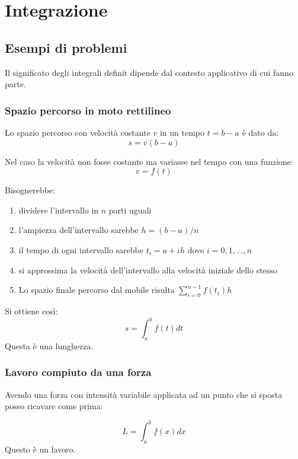 \chapter{Integrazione}

\section{Esempi di problemi}
Il significato degli integrali definit dipende dal contesto applicativo di cui fanno
parte.

\subsection{Spazio percorso in moto rettilineo}
Lo spazio percorso con velocità costante $v$ in un tempo $t = b - a$ è dato da:
\begin{equation*}
  s = v(b-a)
\end{equation*}

Nel caso la velocità non fosse costante ma variasse nel tempo con una funzione:
\begin{equation*}
  v = f(t)
\end{equation*}

Bisognerebbe:
\begin{enumerate}
  \item dividere l'intervallo in $n$ parti uguali
  \item l'ampiezza dell'intervallo sarebbe $h = (b - a) / n$
  \item il tempo di ogni intervallo sarebbe $t_i = a + ih$ dove $i = 0, 1, \dots, n$
  \item si approssima la velocità dell'intervallo alla velocità iniziale dello stesso
  \item Lo spazio finale percorso dal mobile risulta $\sum_{i = 0}^{n-1} f(t_i)h$
\end{enumerate}

Si ottiene così:
\begin{equation*}
  s =\int_a^b f(t) dt
\end{equation*}
Questa è una lunghezza.

\subsection{Lavoro compiuto da una forza}
Avendo una forza con intensità variabile applicata ad un punto che si sposta posso ricavare come prima:

\begin{equation*}
  L =\int_a^b f(x) dx
\end{equation*}
Questo è un lavoro.
